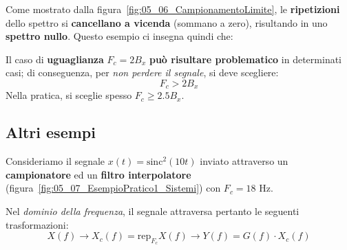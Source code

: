 Come mostrato dalla figura~\ref{fig:05_06_CampionamentoLimite}, le 
\textbf{ripetizioni} dello spettro si \textbf{cancellano a vicenda}
(sommano a zero), risultando in uno \textbf{spettro nullo}.
Questo esempio ci insegna quindi che:

\begin{remark}
    Il caso di \textbf{uguaglianza} $F_c = 2B_x$ \textbf{può risultare problematico}
    in determinati casi; di conseguenza, per \textit{non perdere il segnale},
    si deve scegliere:
    \[
        F_c > 2B_x
    \] 
    Nella pratica, si sceglie spesso $F_c \ge 2.5 B_x$.
\end{remark}

\subsection{Altri esempi}

Consideriamo il segnale $x(t) = \text{sinc}^2 (10t)$ inviato attraverso un 
\textbf{campionatore} ed un \textbf{filtro interpolatore} 
(figura~\ref{fig:05_07_EsempioPratico1_Sistemi}) con $F_c = 18 \text{ Hz}$.

Nel \textit{dominio della frequenza}, il segnale attraversa pertanto 
le seguenti trasformazioni:
\[
    X(f) \longrightarrow X_c(f) = \text{rep}_{F_c} X(f) \longrightarrow Y(f) = G(f)\cdot X_c(f)
\]

